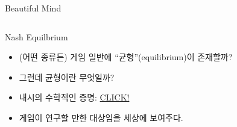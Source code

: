 \documentclass[final]{beamer}
\begin{document}
\begin{frame}[t]{Beautiful Mind}
	\begin{columns}[c]
		\column{13em}
		\column{13em}
	\end{columns}
\end{frame}

\begin{frame}[t]{Nash Equilbrium}
	\begin{itemize}
		\item (어떤 종류든) 게임 일반에 ``균형''(equilibrium)이 존재할까?
		\item 그런데 균형이란 무엇일까?
		\item 내시의 수학적인 증명: \href{http://web.mit.edu/linguistics/events/iap07/Nash-Eqm.pdf}{CLICK!}
		\item 게임이 연구할 만한 대상임을 세상에 보여주다. 
	\end{itemize}
\end{frame}

\end{document}
